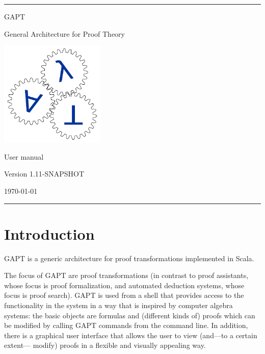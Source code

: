 \documentclass[a4paper,11pt]{article}
\begin{document}
\begin{titlepage}
\begin{center}

\hrule

\vspace*{20mm}

{\Huge GAPT}

\vspace*{5mm}

{\huge General Architecture for Proof Theory}

\vspace*{20mm}

\includegraphics[keepaspectratio,width=5cm]{logo}

\vspace*{20mm}

{\Huge User manual}

\vspace*{10mm}
{\Large Version 1.11-SNAPSHOT}
\vspace*{10mm}

{\Large \today}

\vspace*{20mm}

\hrule
\end{center}

\end{titlepage}

\listoffixmes

\tableofcontents
\vfill
\pagebreak

\section{Introduction}

GAPT is a generic architecture for proof transformations implemented in Scala.

The focus of GAPT are proof transformations (in contrast to proof assistants,
whose focus is proof formalization, and automated deduction systems, whose focus
is proof search). GAPT is used from a shell that provides access to the functionality
in the system in a way that is inspired by computer algebra systems: the basic
objects are formulas and (different kinds of) proofs which can be modified
by calling GAPT commands from the command line. In addition, there
is a graphical user interface that allows the user to view (and—to a certain extent—
modify) proofs in a flexible and visually appealing way.
\end{document}
